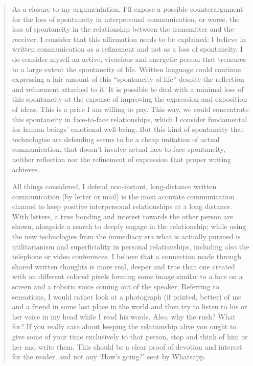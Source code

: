 \documentclass[]{book}
\begin{document}
\begin{quote}
As a closure to my argumentation, I'll expose a possible counterargument for the loss of spontaneity in interpersonal communication, or worse, the loss of spontaneity in the relationship between the transmitter and the receiver. I consider that this affirmation needs to be explained: I believe in written communication as a refinement and not as a loss of spontaneity. I do consider myself an active, vivacious and energetic person that treasures to a large extent the spontaneity of life. Written language could continue expressing a fair amount of this ``spontaneity of life'' despite the reflection and refinement attached to it. It is possible to deal with a minimal loss of this spontaneity at the expense of improving the expression and exposition of ideas. This is a price I am willing to pay. This way, we could concentrate this spontaneity in face-to-face relationships, which I consider fundamental for human beings' emotional well-being. But this kind of spontaneity that technologies are defending seems to be a cheap imitation of actual communication, that doesn't involve actual face-to-face spontaneity, neither reflection nor the refinement of expression that proper writing achieves.

All things considered, I defend non-instant, long-distance written communication (by letter or mail) is the most accurate communication channel to keep positive interpersonal relationships at a long distance. With letters, a true bonding and interest towards the other person are shown, alongside a search to deeply engage in the relationship; while using the new technologies from the immediacy era what is actually pursued is utilitarianism and superficiality in personal relationships, including also the telephone or video conferences. I believe that a connection made through shared written thoughts is more real, deeper and true than one created with on different colored pixels forming some image similar to a face on a screen and a robotic voice coming out of the speaker. Referring to sensations, I would rather look at a photograph (if printed, better) of me and a friend in some lost place in the world and then try to listen to his or her voice in my head while I read his words. Also, why the rush? What for? If you really care about keeping the relationship alive you ought to give some of your time exclusively to that person, stop and think of him or her and write them. This should be a clear proof of devotion and interest for the reader, and not any `How's going?' sent by Whatsapp.
\end{quote}
\end{document}

